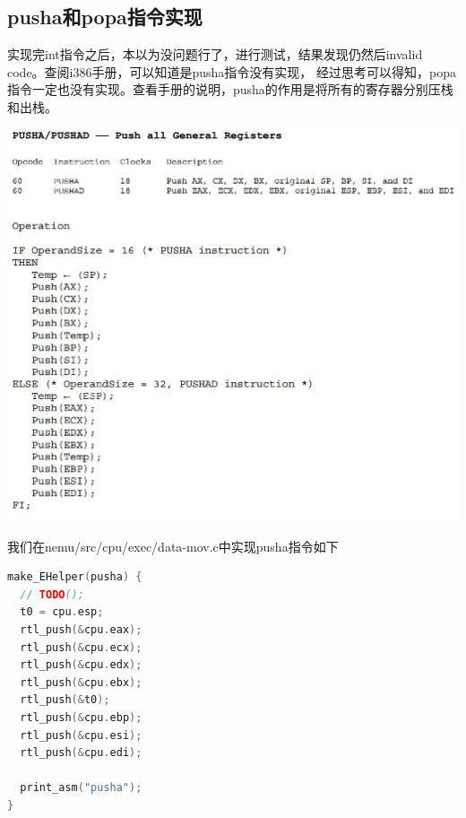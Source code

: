 \documentclass[UTF8,a4paper,10pt]{ctexart}
\begin{document}
\subsection{pusha和popa指令实现}
实现完int指令之后，本以为没问题行了，进行测试，结果发现仍然后invalid code。查阅i386手册，可以知道是pusha指令没有实现， 经过思考可以得知，popa指令一定也没有实现。查看手册的说明，pusha的作用是将所有的寄存器分别压栈和出栈。
\begin{center}
  \includegraphics*[scale= 0.7]{pic/截屏2022-05-16 00.07.42.png}
\end{center}
我们在nemu/src/cpu/exec/data-mov.c中实现pusha指令如下
\begin{lstlisting}[language = C++]
make_EHelper(pusha) {
  // TODO();
  t0 = cpu.esp;
  rtl_push(&cpu.eax);
  rtl_push(&cpu.ecx);
  rtl_push(&cpu.edx);
  rtl_push(&cpu.ebx);
  rtl_push(&t0);
  rtl_push(&cpu.ebp);
  rtl_push(&cpu.esi);
  rtl_push(&cpu.edi);

  print_asm("pusha");
}
\end{lstlisting}
\end{document}
